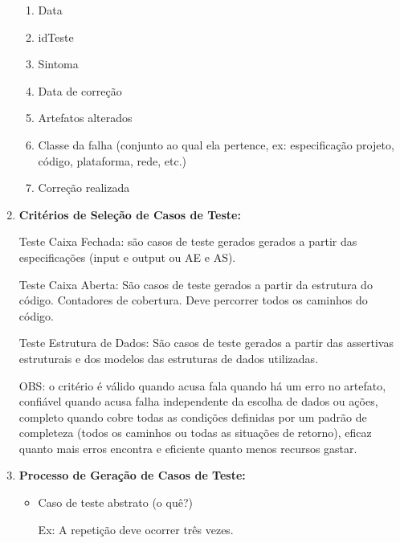 \documentclass[
	12pt, %
]{fphw}
\begin{document}
\begin{doublespace}
\begin{enumerate}[label=\textbf{\arabic*)}]
\begin{enumerate}
                  \item Data

                  \item idTeste

                  \item Sintoma

                  \item Data de correção

                  \item Artefatos alterados

                  \item Classe da falha (conjunto ao qual ela pertence, ex: especificação projeto, código, plataforma, rede, etc.)

                  \item Correção realizada

              \end{enumerate}

        \item \textbf{Critérios de Seleção de Casos de Teste:}

              Teste Caixa Fechada: são casos de teste gerados gerados a partir das especificações (input e output ou AE e AS).

              Teste Caixa Aberta: São casos de teste gerados a partir da estrutura do código. Contadores de cobertura. Deve percorrer todos os caminhos do código.

              Teste Estrutura de Dados: São casos de teste gerados a partir das assertivas estruturais e dos modelos das estruturas de dados utilizadas.

              OBS: o critério é válido quando acusa fala quando há um erro no artefato, confiável quando acusa falha independente da escolha de dados ou ações, completo quando cobre todas as condições definidas por um padrão de completeza (todos os caminhos ou todas as situações de retorno), eficaz quanto mais erros encontra e eficiente quanto menos recursos gastar.

        \item \textbf{Processo de Geração de Casos de Teste:}

              \begin{itemize}

                  \item Caso de teste abstrato (o quê?)

                        Ex: A repetição deve ocorrer três vezes.


\end{itemize}
\end{enumerate}
\end{doublespace}
\end{document}
